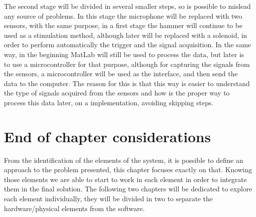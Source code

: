 The second stage will be divided in several smaller steps, so is possible to mislead any source of problems. In this stage the microphone will be replaced with two sensors, with the same purpose, in a first stage the hammer will continue to be used as a stimulation method, although later will be replaced with a solenoid, in order to perform automatically the trigger and the signal acquisition. In the same way, in the beginning MatLab will still be used to process the data, but later is to use a microcontroller for that purpose, although for capturing the signals from the sensors, a microcontroller will be used as the interface, and then send the data to the computer. The reason for this is that this way is easier to understand the type of signals acquired from the sensors and how is the proper way to process this data later, on a implementation, avoiding skipping steps.
\section{End of chapter considerations}
From the identification of the elements of the system, it is possible to define an approach to the problem presented, this chapter focuses exactly on that. Knowing those elements we are able to start to work in each element in order to integrate them in the final solution. The following two chapters will be dedicated to explore each element individually, they will be divided in two to separate the hardware/physical elements from the software.

\clearpage
